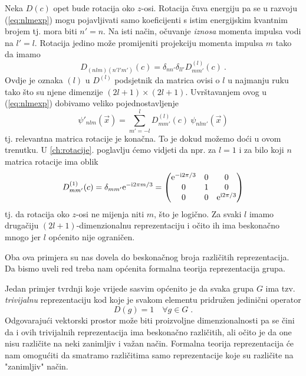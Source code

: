 \begin{primjer}
Neka $D(c)$ opet bude rotacija oko $z$-osi.
Rotacija čuva energiju pa se u razvoju (\ref{eq:nlmexp}) mogu pojavljivati 
samo koeficijenti s istim energijskim kvantnim brojem tj. mora biti $n'=n$. 
Na isti način, očuvanje \emph{iznosa} momenta impulsa vodi na $l'=l$. Rotacija
jedino može promijeniti projekciju momenta impulsa $m$ tako da imamo
\begin{displaymath}
D_{(nlm)(n'l'm')}(c)=\delta_{nn'}\delta_{ll'}D^{(l)}_{mm'}(c) \:.
\end{displaymath}
Ovdje je oznaka $(l)$ u $D^{(l)}$ podsjetnik da matrica ovisi o $l$ u najmanju
ruku tako što su njene dimenzije $(2l+1)\times (2l+1)$. Uvrštavanjem ovog u
(\ref{eq:nlmexp}) dobivamo veliko pojednostavljenje
\begin{displaymath}
\psi'_{nlm}(\vec{x})=  \sum_{m'=-l}^{l} D^{(l)}_{mm'}(c) \: \psi_{nlm'}(\vec{x})
\end{displaymath}
tj. relevantna matrica rotacije je konačna.
To je dokud možemo doći u ovom trenutku. U \ref{ch:rotacije}. poglavlju ćemo
vidjeti da npr. za $l=1$ i za bilo koji $n$ matrica rotacije ima oblik
\begin{equation*}
D^{(1)}_{mm'}(c)=\delta_{mm'}\textrm{e}^{ -\textrm{i} 2\pi m/3} =
\begin{pmatrix}
\textrm{e}^{-\textrm{i} 2\pi/3} & 0 & 0 \\
0 &  1 & 0 \\
0 & 0 & \textrm{e}^{\textrm{i} 2\pi/3}
\end{pmatrix}
\end{equation*}
tj. da rotacija oko $z$-osi ne mijenja niti $m$, što je logično.
Za svaki $l$ imamo drugačiju $(2l+1)$-dimenzionalnu reprezentaciju i
očito ih ima beskonačno mnogo jer $l$ općenito nije ograničen.
\end{primjer}

Oba ova primjera su nas dovela do beskonačnog broja različitih
reprezentacija.
Da bismo uveli red treba nam općenita formalna teorija reprezentacija grupa.


Jedan primjer tvrdnji koje vrijede sasvim općenito je
da svaka grupa $G$ ima tzv. \emph{trivijalnu} reprezentaciju
kod koje je svakom elementu pridružen jedinični operator
\begin{displaymath}
             D(g)=1 \quad \forall g \in G  \;.
\end{displaymath}
Odgovarajući vektorski prostor može biti proizvoljne
dimenzionalnosti pa se čini da i ovih trivijalnih reprezentacija 
ima beskonačno različitih, ali očito je da one nisu različite
na neki zanimljiv i važan način. Formalna teorija reprezentacija
će nam omogućiti da smatramo različitima samo reprezentacije koje
su različite na "zanimljiv" način.

